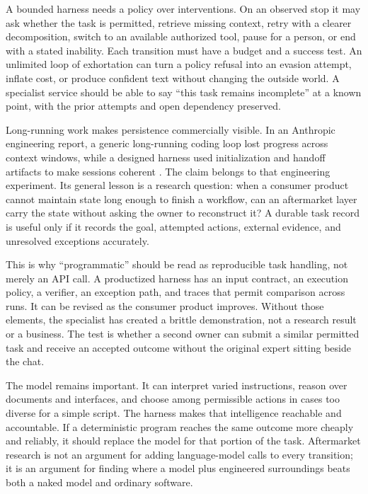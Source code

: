 A bounded harness needs a policy over interventions. On an observed stop it may ask whether the task is permitted, retrieve missing context, retry with a clearer decomposition, switch to an available authorized tool, pause for a person, or end with a stated inability. Each transition must have a budget and a success test. An unlimited loop of exhortation can turn a policy refusal into an evasion attempt, inflate cost, or produce confident text without changing the outside world. A specialist service should be able to say ``this task remains incomplete'' at a known point, with the prior attempts and open dependency preserved.

Long-running work makes persistence commercially visible. In an Anthropic engineering report, a generic long-running coding loop lost progress across context windows, while a designed harness used initialization and handoff artifacts to make sessions coherent \citep{anthropiclong}. The claim belongs to that engineering experiment. Its general lesson is a research question: when a consumer product cannot maintain state long enough to finish a workflow, can an aftermarket layer carry the state without asking the owner to reconstruct it? A durable task record is useful only if it records the goal, attempted actions, external evidence, and unresolved exceptions accurately.

This is why ``programmatic'' should be read as reproducible task handling, not merely an API call. A productized harness has an input contract, an execution policy, a verifier, an exception path, and traces that permit comparison across runs. It can be revised as the consumer product improves. Without those elements, the specialist has created a brittle demonstration, not a research result or a business. The test is whether a second owner can submit a similar permitted task and receive an accepted outcome without the original expert sitting beside the chat.

The model remains important. It can interpret varied instructions, reason over documents and interfaces, and choose among permissible actions in cases too diverse for a simple script. The harness makes that intelligence reachable and accountable. If a deterministic program reaches the same outcome more cheaply and reliably, it should replace the model for that portion of the task. Aftermarket research is not an argument for adding language-model calls to every transition; it is an argument for finding where a model plus engineered surroundings beats both a naked model and ordinary software.
